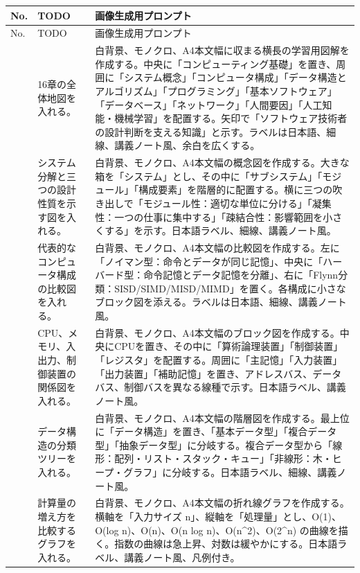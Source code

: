 \documentclass[a4paper,11pt]{ltjsarticle}
\begin{document}
\begin{longtable}{>{\raggedright\arraybackslash}p{}>{\raggedright\arraybackslash}p{}>{\raggedright\arraybackslash}p{}}
\toprule
No. & TODO & 画像生成用プロンプト \\
\midrule
\endfirsthead
\toprule
No. & TODO & 画像生成用プロンプト \\
\midrule
\endhead
1 & 16章の全体地図を入れる。 & 白背景、モノクロ、A4本文幅に収まる横長の学習用図解を作成する。中央に「コンピューティング基礎」を置き、周囲に「システム概念」「コンピュータ構成」「データ構造とアルゴリズム」「プログラミング」「基本ソフトウェア」「データベース」「ネットワーク」「人間要因」「人工知能・機械学習」を配置する。矢印で「ソフトウェア技術者の設計判断を支える知識」と示す。ラベルは日本語、細線、講義ノート風、余白を広くする。 \\
2 & システム分解と三つの設計性質を示す図を入れる。 & 白背景、モノクロ、A4本文幅の概念図を作成する。大きな箱を「システム」とし、その中に「サブシステム」「モジュール」「構成要素」を階層的に配置する。横に三つの吹き出しで「モジュール性：適切な単位に分ける」「凝集性：一つの仕事に集中する」「疎結合性：影響範囲を小さくする」を示す。日本語ラベル、細線、講義ノート風。 \\
3 & 代表的なコンピュータ構成の比較図を入れる。 & 白背景、モノクロ、A4本文幅の比較図を作成する。左に「ノイマン型：命令とデータが同じ記憶」、中央に「ハーバード型：命令記憶とデータ記憶を分離」、右に「Flynn分類：SISD/SIMD/MISD/MIMD」を置く。各構成に小さなブロック図を添える。ラベルは日本語、細線、講義ノート風。 \\
4 & CPU、メモリ、入出力、制御装置の関係図を入れる。 & 白背景、モノクロ、A4本文幅のブロック図を作成する。中央にCPUを置き、その中に「算術論理装置」「制御装置」「レジスタ」を配置する。周囲に「主記憶」「入力装置」「出力装置」「補助記憶」を置き、アドレスバス、データバス、制御バスを異なる線種で示す。日本語ラベル、講義ノート風。 \\
5 & データ構造の分類ツリーを入れる。 & 白背景、モノクロ、A4本文幅の階層図を作成する。最上位に「データ構造」を置き、「基本データ型」「複合データ型」「抽象データ型」に分岐する。複合データ型から「線形：配列・リスト・スタック・キュー」「非線形：木・ヒープ・グラフ」に分岐する。日本語ラベル、細線、講義ノート風。 \\
6 & 計算量の増え方を比較するグラフを入れる。 & 白背景、モノクロ、A4本文幅の折れ線グラフを作成する。横軸を「入力サイズ n」、縦軸を「処理量」とし、O(1)、O(log n)、O(n)、O(n log n)、O(n\textasciicircum{}2)、O(2\textasciicircum{}n) の曲線を描く。指数の曲線は急上昇、対数は緩やかにする。日本語ラベル、講義ノート風、凡例付き。 \\

\end{longtable}
\end{document}
